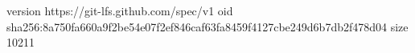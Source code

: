 version https://git-lfs.github.com/spec/v1
oid sha256:8a750fa660a9f2be54e07f2ef846caf63fa8459f4127cbe249d6b7db2f478d04
size 10211
